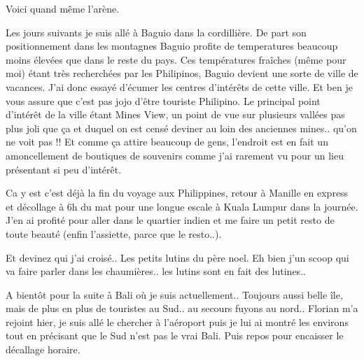 \begin{multicols}{2}
Voici quand même l'arène.


Les jours suivants je suis allé à Baguio dans la cordillière. De part son positionnement dans les montagnes Baguio profite de temperatures beaucoup moins élevées que dans le reste du pays. Ces températures fraîches (même pour moi) étant très recherchées par les Philipinos, Baguio devient une sorte de ville de vacances. J'ai donc essayé d'écumer les centres d'intérêts de cette ville. Et ben je vous assure que c'est pas jojo d'être touriste Philipino. Le principal point d'intérêt de la ville étant Mines View, un point de vue sur plusieurs vallées pas plus joli que ça et duquel on est censé deviner au loin des anciennes mines.. qu'on ne voit pas !! Et comme ça attire beaucoup de gens, l'endroit est en fait un amoncellement de boutiques de souvenirs comme j'ai rarement vu pour un lieu présentant si peu d'intérêt.


Ca y est c'est déjà la fin du voyage aux Philippines, retour à Manille en express et décollage à 6h du mat pour une longue escale à Kuala Lumpur dans la journée. J'en ai profité pour aller dans le quartier indien et me faire un petit resto de toute beauté (enfin l'assiette, parce que le resto..).


Et devinez qui j'ai croisé.. Les petits lutins du père noel. Eh bien j'un scoop qui va faire parler dans les chaumières.. les lutins sont en fait des lutines..


A bientôt pour la suite à Bali où je suis actuellement.. Toujours aussi belle île, mais de plus en plus de touristes au Sud.. au secours fuyons au nord.. Florian m'a rejoint hier, je suis allé le chercher à l'aéroport puis je lui ai montré les environs tout en précisant que le Sud n'est pas le vrai Bali. Puis repos pour encaisser le décallage horaire.

\end{multicols}


